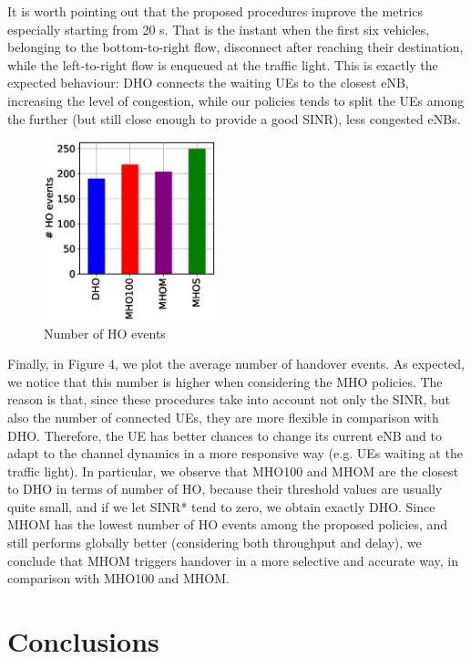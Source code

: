 \documentclass[conference,10pt]{IEEEtran}
\begin{document}
It is worth pointing out that the proposed procedures improve the metrics especially starting from 20 s. That is the instant when the first six vehicles, belonging to the bottom-to-right flow, disconnect after reaching their destination, while the left-to-right flow is enqueued at the traffic light. This is exactly the expected behaviour: DHO connects the waiting UEs to the closest eNB, increasing the level of congestion, while our policies tends to split the UEs among the further (but still close enough to provide a good SINR), less congested eNBs.

\begin{figure}[h]
	\begin{center}    
		\includegraphics[width=5cm, keepaspectratio]{images/ho_events.eps}
		\caption{Number of HO events}
	\end{center}
\end{figure}

Finally, in Figure 4, we plot the average number of handover events. As expected, we notice that this number is higher when considering the MHO policies. The reason is that, since these procedures take into account not only the SINR, but also the number of connected UEs, they are more flexible in comparison with DHO. Therefore, the UE has better chances to change its current eNB and to adapt to the channel dynamics in a more responsive way (e.g. UEs waiting at the traffic light). In particular, we observe that MHO100 and MHOM are the closest to DHO in terms of number of HO, because their threshold values are usually quite small, and if we let SINR* tend to zero, we obtain exactly DHO. Since MHOM has the lowest number of HO events among the proposed policies, and still performs globally better (considering both throughput and delay), we conclude that MHOM triggers handover in a more selective and accurate way, in comparison with MHO100 and MHOM.

\section{Conclusions}\label{sec:conclusion}
\end{document}
